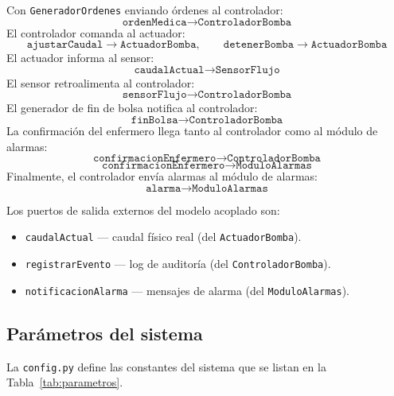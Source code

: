\documentclass[12pt,a4paper]{article}
\begin{document}
Con \texttt{GeneradorOrdenes} enviando órdenes al controlador:
\[\texttt{ordenMedica} \to \texttt{ControladorBomba}\]
El controlador comanda al actuador:
\[\texttt{ajustarCaudal} \to \texttt{ActuadorBomba},\qquad
\texttt{detenerBomba} \to \texttt{ActuadorBomba}\]
El actuador informa al sensor:
\[\texttt{caudalActual} \to \texttt{SensorFlujo}\]
El sensor retroalimenta al controlador:
\[\texttt{sensorFlujo} \to \texttt{ControladorBomba}\]
El generador de fin de bolsa notifica al controlador:
\[\texttt{finBolsa} \to \texttt{ControladorBomba}\]
La confirmación del enfermero llega tanto al controlador como
al módulo de alarmas:
\[\texttt{confirmacionEnfermero} \to \texttt{ControladorBomba}\]
\[\texttt{confirmacionEnfermero} \to \texttt{ModuloAlarmas}\]
Finalmente, el controlador envía alarmas al módulo de alarmas:
\[\texttt{alarma} \to \texttt{ModuloAlarmas}\]

Los puertos de salida externos del modelo acoplado son:

\begin{itemize}
    \item \texttt{caudalActual} --- caudal físico real (del
          \texttt{ActuadorBomba}).
    \item \texttt{registrarEvento} --- log de auditoría (del
          \texttt{ControladorBomba}).
    \item \texttt{notificacionAlarma} --- mensajes de alarma (del
          \texttt{ModuloAlarmas}).
\end{itemize}

\subsection{Parámetros del sistema}

La \texttt{config.py} define las constantes del sistema que se listan
en la Tabla~\ref{tab:parametros}.
\end{document}
